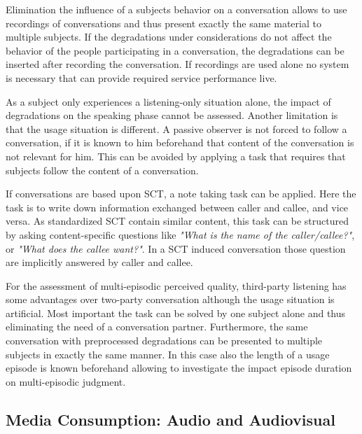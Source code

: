 Elimination the influence of a subjects behavior on a conversation allows to use recordings of conversations and thus present exactly the same material to multiple subjects.
If the degradations under considerations do not affect the behavior of the people participating in a conversation, the degradations can be inserted after recording the conversation.
If recordings are used alone no system is necessary that can provide required service performance live.

As a subject only experiences a listening-only situation alone, the impact of degradations on the speaking phase cannot be assessed.
Another limitation is that the usage situation is different.
A passive observer is not forced to follow a conversation, if it is known to him beforehand that content of the conversation is not relevant for him.
This can be avoided by applying a task that requires that subjects follow the content of a conversation.

If conversations are based upon \acs{SCT}, a note taking task can be applied.
Here the task is to write down information exchanged between caller and callee, and vice versa.
As standardized \acs{SCT} \citep{itu-t_p.805:_2007} contain similar content, this task can be structured by asking content-specific questions like \emph{"What is the name of the caller/callee?"}, or \emph{"What does the callee want?"}.
In a \ac{SCT} induced conversation those question are implicitly answered by caller and callee.

For the assessment of multi-episodic perceived quality, third-party listening has some advantages over two-party conversation although the usage situation is artificial.
Most important the task can be solved by one subject alone and thus eliminating the need of a conversation partner.
Furthermore, the same conversation with preprocessed degradations can be presented to multiple subjects in exactly the same manner.
In this case also the length of a usage episode is known beforehand allowing to investigate the impact episode duration on multi-episodic judgment.

\subsection{Media Consumption: Audio and Audiovisual}





